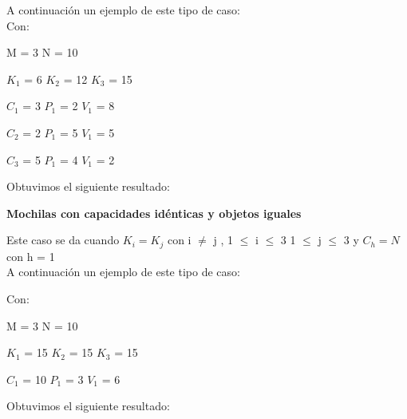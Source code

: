 A continuaci\'on un ejemplo de este tipo de caso:\\

 Con:
 
 M = 3 N = 10
 
 $K_{1}$ = 6  $K_{2}$ = 12  $K_{3}$ = 15
 
 $C_{1}$ = 3 $P_{1}$ = 2 $V_{1}$ = 8
 
 $C_{2}$ = 2 $P_{1}$ = 5 $V_{1}$ = 5
 
 $C_{3}$ = 5 $P_{1}$ = 4 $V_{1}$ = 2
  
  \indent  
  
  Obtuvimos el siguiente resultado:\\


\begin{center}
 \textbf{Mochilas con capacidades id\'enticas y objetos iguales}
\end{center}

Este caso se da cuando $K_{i} = K_{j}$ con i $\neq$ j , 1 $\leq$ i $\leq$ 3  1 $\leq$ j $\leq$ 3  y $C_{h} = N$ con h = 1\\

A continuaci\'on un ejemplo de este tipo de caso:

 Con:
 
 M = 3 N = 10
 
 $K_{1}$ = 15  $K_{2}$ = 15  $K_{3}$ = 15
 
 $C_{1}$ = 10 $P_{1}$ = 3 $V_{1}$ = 6
 
  \indent  
  
  Obtuvimos el siguiente resultado:\\
